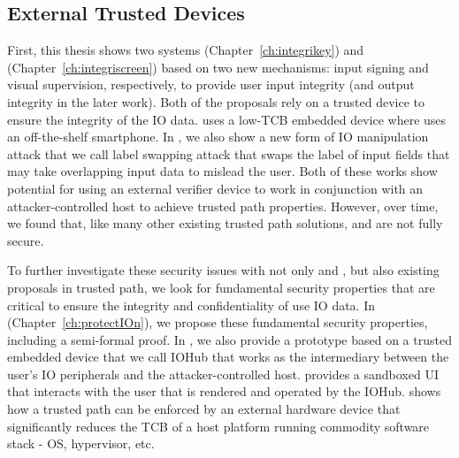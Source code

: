 \subsection{External Trusted Devices}

First, this thesis shows two systems \integrikey (Chapter~\ref{ch:integrikey}) and \integriscreen (Chapter~\ref{ch:integriscreen}) based on two new mechanisms: input signing and visual supervision, respectively, to provide user input integrity (and output integrity in the later work). Both of the proposals rely on a trusted device to ensure the integrity of the IO data. \integrikey uses a low-TCB embedded device where \integriscreen uses an off-the-shelf smartphone. In \integrikey, we also show a new form of IO manipulation attack that we call label swapping attack that swaps the label of input fields that may take overlapping input data to mislead the user. Both of these works show potential for using an external verifier device to work in conjunction with an attacker-controlled host to achieve trusted path properties. However, over time, we found that, like many other existing trusted path solutions, \integrikey and \integriscreen are not fully secure.

To further investigate these security issues with not only \integrikey and \integriscreen, but also existing proposals in trusted path, we look for fundamental security properties that are critical to ensure the integrity and confidentiality of use IO data. In \protection (Chapter~\ref{ch:protectIOn}), we propose these fundamental security properties, including a semi-formal proof. In \protection, we also provide a prototype based on a trusted embedded device that we call IOHub that works as the intermediary between the user's IO peripherals and the attacker-controlled host. \protection provides a sandboxed UI that interacts with the user that is rendered and operated by the IOHub. \protection shows how a trusted path can be enforced by an external hardware device that significantly reduces the TCB of a host platform running commodity software stack - OS, hypervisor, etc.

